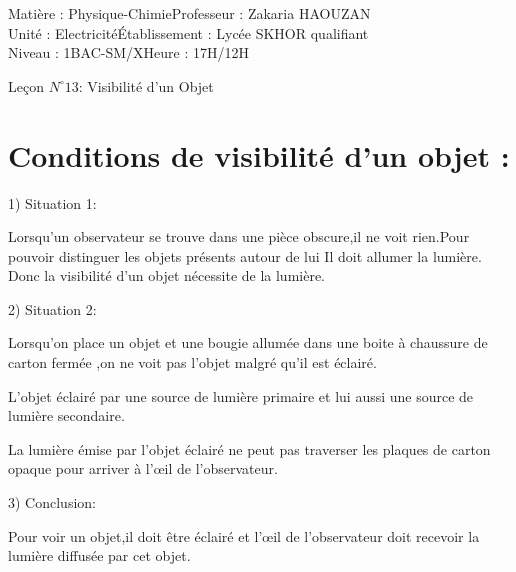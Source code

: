 \documentclass[12pt]{article}
\author{Zakaria HAOUZAN}
\date{\today}
\newcommand\headerMe[2]{\noindent{}#1\hfill#2}
\begin{document}
\headerMe{Matière : Physique-Chimie}{Professeur : Zakaria HAOUZAN}\\
\headerMe{Unité : Electricité}{Établissement : Lycée SKHOR qualifiant}\\
\headerMe{Niveau : 1BAC-SM/X}{Heure : 17H/12H}\\




\begin{center}

    \Large{Leçon $N^{\circ} 13 $: \color{red} Visibilité d'un Objet}
\end{center}

  \section{Conditions de visibilité d’un objet : }
1) Situation 1:

  Lorsqu'un observateur se trouve dans une pièce obscure,il ne voit rien.Pour pouvoir distinguer les objets présents autour
de lui Il doit allumer la lumière. Donc la visibilité d’un objet nécessite de la lumière.

2) Situation 2:

  Lorsqu'on place un objet et une bougie allumée dans une boite à chaussure de carton fermée ,on ne voit pas l'objet
malgré qu'il est éclairé.

  L'objet éclairé par une source de lumière primaire et lui aussi une source de lumière secondaire.

  La lumière émise par l'objet éclairé ne peut pas traverser les plaques de carton opaque pour arriver à l'œil de l'observateur.

3) Conclusion:

  Pour voir un objet,il doit être éclairé et l'œil de l'observateur doit recevoir la lumière diffusée par cet objet.
\end{document}
